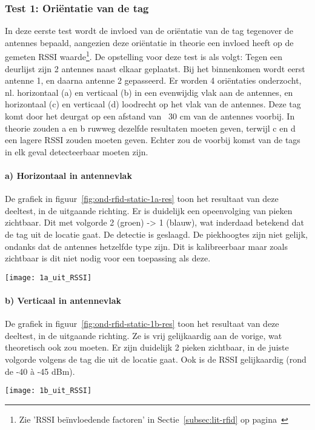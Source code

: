 \subsubsection{Test 1: Oriëntatie van de tag}
\label{sec:ond-rfid-2-1}
In deze eerste test wordt de invloed van de oriëntatie van de tag tegenover de antennes bepaald, aangezien deze oriëntatie in theorie een invloed heeft op de gemeten RSSI waarde\footnote{Zie 'RSSI beïnvloedende factoren' in Sectie~\ref{subsec:lit-rfid} op pagina~\pageref{subsec:lit-rfid}}. De opstelling voor deze test is als volgt: Tegen een deurlijst zijn 2 antennes naast elkaar geplaatst. Bij het binnenkomen wordt eerst antenne 1, en daarna antenne 2 gepasseerd. Er worden 4 oriëntaties onderzocht, nl. horizontaal (a) en verticaal (b) in een evenwijdig vlak aan de antennes, en horizontaal (c) en verticaal (d) loodrecht op het vlak van de antennes. Deze tag komt door het deurgat op een afstand van ~30 cm van de antennes voorbij.
In theorie zouden a en b ruwweg dezelfde resultaten moeten geven, terwijl c en d een lagere RSSI zouden moeten geven. Echter zou de voorbij komst van de tags in elk geval detecteerbaar moeten zijn.

\paragraph{a) Horizontaal in antennevlak}
\begin{minipage}{0.55\textwidth}
De grafiek in figuur~\ref{fig:ond-rfid-static-1a-res} toon het resultaat van deze deeltest, in de uitgaande richting. Er is duidelijk een opeenvolging van pieken zichtbaar. Dit met volgorde 2 (groen) -> 1 (blauw), wat inderdaad betekend dat de tag uit de locatie gaat. De detectie is geslaagd. De piekhoogtes zijn niet gelijk, ondanks dat de antennes hetzelfde type zijn. Dit is kalibreerbaar maar zoals zichtbaar is dit niet nodig voor een toepassing als deze.
\end{minipage}
\hfill
\begin{minipage}{0.42\textwidth}
	\texttt{[image: 1a\_uit\_RSSI]}
	\label{fig:ond-rfid-static-1a-res}
\end{minipage}

\paragraph{b) Verticaal in antennevlak}
\begin{minipage}{0.55\textwidth}
De grafiek in figuur~\ref{fig:ond-rfid-static-1b-res} toon het resultaat van deze deeltest, in de uitgaande richting. Ze is vrij gelijkaardig aan de vorige, wat theoretisch ook zou moeten. Er zijn duidelijk 2 pieken zichtbaar, in de juiste volgorde volgens de tag die uit de locatie gaat. Ook is de RSSI gelijkaardig (rond de -40 à -45 dBm).
\end{minipage}
\hfill
\begin{minipage}{0.42\textwidth}
	\texttt{[image: 1b\_uit\_RSSI]}
	\label{fig:ond-rfid-static-1b-res}
\end{minipage}

